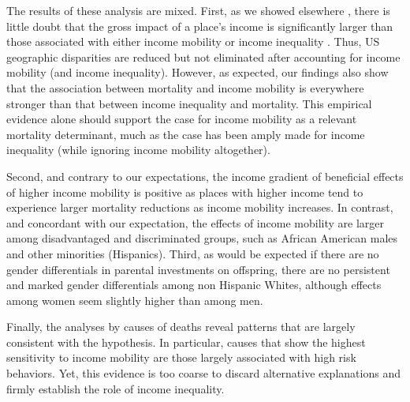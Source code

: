 \documentclass[11pt]{article}
\begin{document}
The results of these analysis are mixed. First, as we showed elsewhere \citep{Palloni2016}, there is little doubt that the gross impact of a place's income is significantly larger than those associated with either income mobility or income inequality \citep{Chetty2016}. Thus, US geographic disparities are reduced but not eliminated after accounting for income mobility (and income inequality). However, as expected, our findings also show that the association between mortality and income mobility is everywhere stronger than that between income inequality and mortality. This empirical evidence alone should support the case for income mobility as a relevant mortality determinant, much as the case has been amply made for income inequality (while ignoring income mobility altogether). 


Second, and contrary to our expectations, the income gradient of beneficial effects of higher income mobility is positive as places with higher income tend to experience larger mortality reductions as income mobility increases. In contrast, and concordant with our expectation, the effects of income mobility are larger among disadvantaged and discriminated groups, such as African American males and other minorities (Hispanics).
Third, as would be expected if there are no gender differentials in parental investments on offspring,  there are no persistent and marked gender differentials among non Hispanic Whites, although effects among women seem slightly higher than among men. 

Finally, the analyses by causes of deaths reveal patterns that are largely consistent with the hypothesis. In particular, causes that show the highest sensitivity to income mobility are those largely associated with high risk behaviors. Yet, this evidence is too coarse to discard alternative explanations and firmly establish the role of income inequality.
\end{document}
